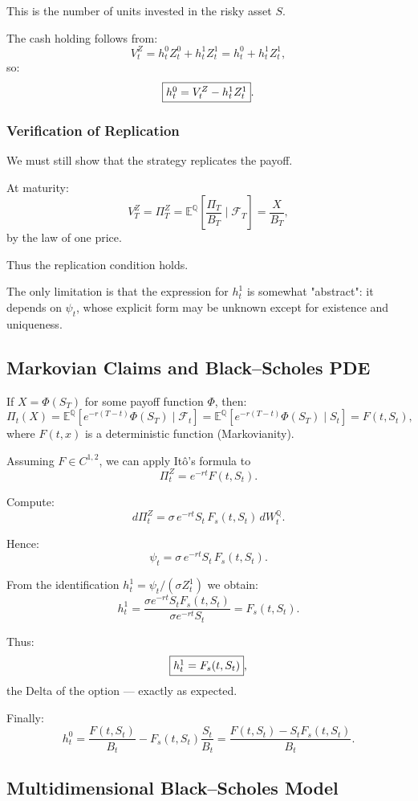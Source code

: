 \documentclass[12pt,a4paper]{article}
\theoremstyle{definition}
\begin{document}
This is the number of units invested in the risky asset $S$.

The cash holding follows from:
\[
V_t^Z = h_t^0 Z_t^0 + h_t^1 Z_t^1 = h_t^0 + h_t^1 Z_t^1,
\]
so:
\[
\fbox{$h_t^0 = V_t^Z - h_t^1 Z_t^1$}.
\]

\subsubsection{Verification of Replication}

We must still show that the strategy replicates the payoff.

At maturity:
\[
V_T^Z = \Pi_T^Z = \mathbb{E}^\mathbb{Q}\left[\frac{\Pi_T}{B_T} \mid \mathcal{F}_T\right] = \frac{X}{B_T},
\]
by the law of one price.

Thus the replication condition holds.

The only limitation is that the expression for $h_t^1$ is somewhat "abstract": it depends on $\psi_t$, whose explicit form may be unknown except for existence and uniqueness.

\subsection{Markovian Claims and Black--Scholes PDE}

If $X = \Phi(S_T)$ for some payoff function $\Phi$, then:
\[
\Pi_t(X) = \mathbb{E}^\mathbb{Q}[e^{-r(T-t)} \Phi(S_T) \mid \mathcal{F}_t] = \mathbb{E}^\mathbb{Q}[e^{-r(T-t)} \Phi(S_T) \mid S_t] = F(t, S_t),
\]
where $F(t, x)$ is a deterministic function (Markovianity).

Assuming $F \in C^{1,2}$, we can apply Itô's formula to
\[
\Pi_t^Z = e^{-rt} F(t, S_t).
\]

Compute:
\[
d\Pi_t^Z = \sigma \, e^{-rt} S_t \, F_s(t, S_t) \, dW_t^\mathbb{Q}.
\]

Hence:
\[
\psi_t = \sigma \, e^{-rt} S_t \, F_s(t, S_t).
\]

From the identification $h_t^1 = \psi_t / (\sigma Z_t^1)$ we obtain:
\[
h_t^1 = \frac{\sigma e^{-rt} S_t F_s(t, S_t)}{\sigma e^{-rt} S_t} = F_s(t, S_t).
\]

Thus:
\[
\fbox{$h_t^1 = F_s(t, S_t)$},
\]
the Delta of the option — exactly as expected.

Finally:
\[
h_t^0 = \frac{F(t, S_t)}{B_t} - F_s(t, S_t) \frac{S_t}{B_t} = \frac{F(t, S_t) - S_t F_s(t, S_t)}{B_t}.
\]

\subsection{Multidimensional Black--Scholes Model}
\end{document}
